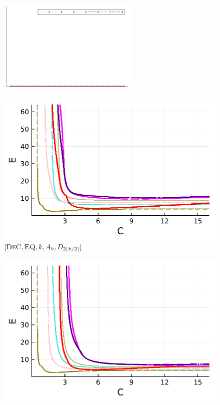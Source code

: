 \begin{figure}
	\centering
	\includegraphics[width=0.6\textwidth,trim={160 340 30 22}, clip]{pdf/pdepics/legends/colors_a-d_new_horiz_2-8_no_order.pdf}\\
	\begin{minipage}[t]{0.32\textwidth}
		\includegraphics[width=\textwidth]{pdf/pdepics/diff/IMEXDeC_equispaced_all_2-8.pdf}
		\centering
		$[\textsc{DeC},\textsc{EQ}, k, A_k,D_{2\lceil k/2 \rceil}]$
	\end{minipage} 
	\begin{minipage}[t]{0.32\textwidth}
		\includegraphics[width=\textwidth]{pdf/pdepics/diff/IMEXDeC_subtimesteps_equispaced_all_2-8.pdf}

\end{minipage}
\end{figure}
